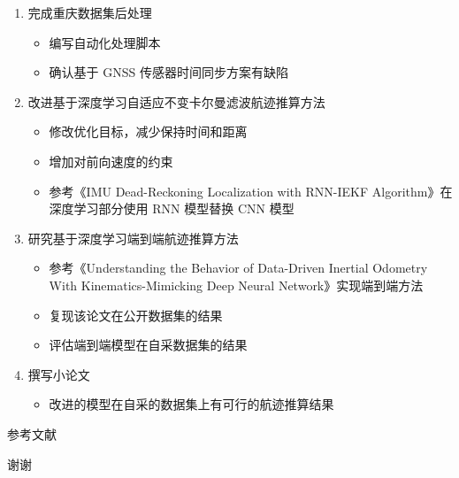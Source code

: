 \documentclass{beamer} %
\begin{document}
\begin{frame}[allowframebreaks]
    \begin{enumerate}
        \item 完成重庆数据集后处理
        \begin{itemize}
            \item 编写自动化处理脚本
            \item 确认基于 GNSS 传感器时间同步方案有缺陷
        \end{itemize}

        \item 改进基于深度学习自适应不变卡尔曼滤波航迹推算方法
        \begin{itemize}
            \item 修改优化目标，减少保持时间和距离
            \item 增加对前向速度的约束
            \item 参考《IMU Dead-Reckoning Localization with RNN-IEKF Algorithm》在深度学习部分使用 RNN 模型替换 CNN 模型
        \end{itemize}

        \item 研究基于深度学习端到端航迹推算方法
        \begin{itemize}
            \item 参考《Understanding the Behavior of Data-Driven Inertial Odometry With Kinematics-Mimicking Deep Neural Network》实现端到端方法
            \item 复现该论文在公开数据集的结果
            \item 评估端到端模型在自采数据集的结果
        \end{itemize}

        \item 撰写小论文
        \begin{itemize}
            \item 改进的模型在自采的数据集上有可行的航迹推算结果
        \end{itemize}
    \end{enumerate}
\end{frame}


\begin{frame}[allowframebreaks]{参考文献} %
	\printbibliography[heading=references]
\end{frame}


\begin{frame}
    \begin{center}
        {\Huge 谢谢}
    \end{center}
\end{frame}
\end{document}
